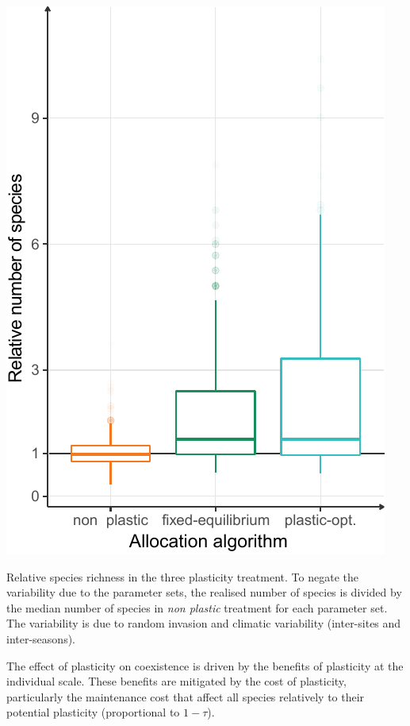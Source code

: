 \begin{marginfigure}\label{fig:species_richness}
\includegraphics[]{./2_PP/Figures/Comm/comm_n_sp_differences.pdf}
\caption[Relative species richness in plasticity treatments]{Relative species richness in the three plasticity treatment. To negate the variability due to the parameter sets, the realised number of species is divided by the median number of species in \textit{non plastic} treatment for each parameter set. The variability is due to random invasion and climatic variability (inter-sites and inter-seasons).}
\end{marginfigure}

The effect of plasticity on coexistence is driven by the benefits of plasticity at the individual scale. These benefits are mitigated by the cost of plasticity, particularly the maintenance cost that affect all species relatively to their potential plasticity (proportional to $ 1- \tau$).

